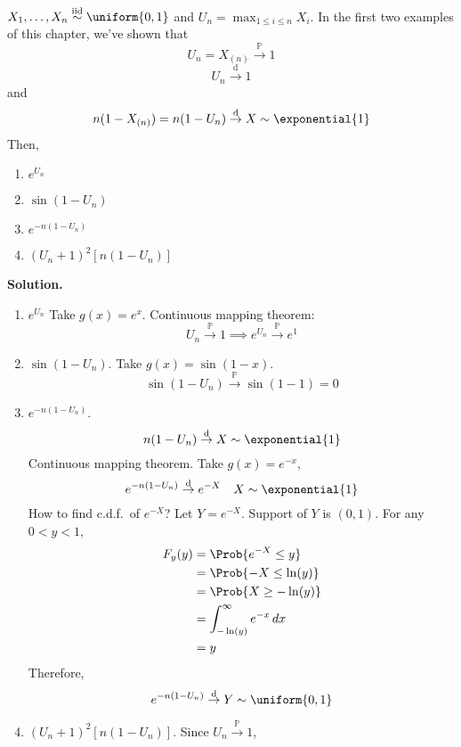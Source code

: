 \begin{Example}{}{}
    $ X_1,\ldots,X_n \stackrel{\text{iid}}{\sim}\uniform{0,1} $
    and $ U_n=\max_{1\le i\le n}X_i $. In the first two examples
    of this chapter, we've shown that
    \[ U_n=X_{(n)}\stackrel{\mathbb{P}}{\to}1 \]
    \[ U_n\stackrel{\text{d}}{\to}1 \]
    and
    \[ n(1-X_{(n)})=n(1-U_n)\stackrel{\text{d}}{\to} X \sim \exponential{1} \]
    Then,
    \begin{enumerate}[label=(\roman*)]
        \item $ e^{U_n} $
        \item $ \sin(1-U_n) $
        \item $ e^{-n(1-U_n)} $
        \item $ (U_n+1)^2[n(1-U_n)] $
    \end{enumerate}
    \textbf{Solution.}
    \begin{enumerate}[label=(\roman*)]
        \item $ e^{U_n} $
              Take $ g(x)=e^x $. Continuous mapping theorem:
              \[ U_n\stackrel{\mathbb{P}}{\to}1\implies e^{U_n}
                  \stackrel{\mathbb{P}}{\to} e^1 \]
        \item $ \sin(1-U_n) $. Take $ g(x)=\sin(1-x) $.
              \[ \sin(1-U_n)\stackrel{\mathbb{P}}{\to}\sin(1-1)=0 \]
        \item $ e^{-n(1-U_n)} $.
              \[ n(1-U_n)\stackrel{\text{d}}{\to} X \sim \exponential{1} \]
              Continuous mapping theorem. Take $ g(x)=e^{-x} $,
              \[ e^{-n(1-U_n)}\stackrel{\text{d}}{\to}e^{-X}\quad X \sim \exponential{1} \]
              How to find c.d.f.\ of $ e^{-X} $? Let $ Y=e^{-X} $.
              Support of $ Y $ is $ (0,1) $. For any $ 0<y<1 $,
              \begin{align*}
                  F_y(y)
                   & =\Prob{e^{-X}\le y}                    \\
                   & =\Prob{-X\le \ln(y)}                   \\
                   & =\Prob{X\ge -\ln(y)}                   \\
                   & =\int_{-\ln(y)}^{\infty} e^{-x}\, d{x} \\
                   & =y
              \end{align*}
              Therefore,
              \[ e^{-n(1-U_n)}\stackrel{\text{d}}{\to} Y \sim \uniform{0,1} \]
        \item $ (U_n+1)^2[n(1-U_n)] $. Since $ U_n\stackrel{\mathbb{P}}{\to}1 $,

\end{enumerate}
\end{Example}

